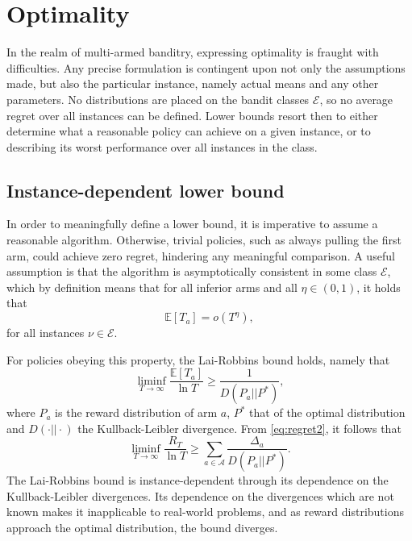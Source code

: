 \section{Optimality}
In the realm of multi-armed banditry, expressing optimality is fraught with difficulties.
Any precise formulation is contingent upon not only the assumptions made, but also the particular instance, namely actual means and any other parameters.
No distributions are placed on the bandit classes $\mathcal{E}$, so no average regret over all instances can be defined.
Lower bounds resort then to either determine what a reasonable policy can achieve on a given instance, or to describing its worst performance over all instances in the class.

\subsection{Instance-dependent lower bound}
In order to meaningfully define a lower bound, it is imperative to assume a reasonable algorithm.
Otherwise, trivial policies, such as always pulling the first arm, could achieve zero regret, hindering any meaningful comparison.
A useful assumption is that the algorithm is asymptotically consistent in some class $\mathcal{E}$, which by definition means that for all inferior arms and all $\eta \in (0, 1)$, it holds that
\begin{equation}
    \mathbb{E}[T_a] = o(T^{\eta}),
\end{equation}
for all instances $\nu \in \mathcal{E}$.

For policies obeying this property, the Lai-Robbins bound \cite{lai1985} holds, namely that
\begin{equation}
    \liminf_{T\to\infty} \frac{\mathbb{E}[T_a]}{\ln T} \geq \frac{1}{D(P_a || P^*)},
\end{equation}
where $P_a$ is the reward distribution of arm $a$, $P^*$ that of the optimal distribution and $D(\cdot || \cdot)$ the Kullback-Leibler divergence.
From \cref{eq:regret2}, it follows that
\begin{equation}
    \liminf_{T\to\infty} \frac{R_T}{\ln T} \geq \sum_{a \in \mathcal{A}}\frac{\Delta_a}{D(P_a || P^*)}.
\end{equation}
The Lai-Robbins bound is instance-dependent through its dependence on the Kullback-Leibler divergences.
Its dependence on the divergences which are not known makes it inapplicable to real-world problems,
and as reward distributions approach the optimal distribution, the bound diverges.


